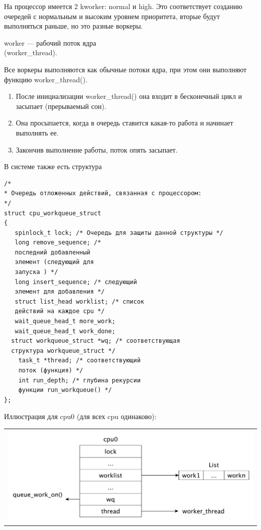 На процессор имеется 2 kworker: normal и high. Это соответствует созданию очередей с нормальным и высоким уровнем приоритета, вторые будут выполняться раньше, но это разные воркеры.

worker --- рабочий поток ядра \\ (worker\_thread).

Все воркеры выполняются как обычные потоки ядра, при этом они выполняют функцию worker\_thread().
\begin{enumerate}
  \item После инициализации worker\_thread() она входит в бесконечный цикл и засыпает (прерываемый сон).
  \item Она просыпается, когда в очередь ставится какая-то работа и начинает выполнять ее.
  \item Закончив выполнение работы, поток опять засыпает.
\end{enumerate}

В системе также есть структура

\begin{lstlisting}
/*
* Очередь отложенных действий, связанная с процессором:
*/
struct cpu_workqueue_struct 
{
   spinlock_t lock; /* Очередь для защиты данной структуры */
   long remove_sequence; /* 
   последний добавленный 
   элемент (следующий для 
   запуска ) */
   long insert_sequence; /* следующий 
   элемент для добавления */
   struct list_head worklist; /* список 
   действий на каждое cpu */
   wait_queue_head_t more_work;
   wait_queue_head_t work_done;
  struct workqueue_struct *wq; /* соответствующая 
  структура workqueue_struct */
    task_t *thread; /* соответствующий 
    поток (функция) */
    int run_depth; /* глубина рекурсии 
    функции run_workqueue() */
};
\end{lstlisting}

Иллюстрация для cpu0 (для всех cpu одинаково):

\begin{table}[h!]
  \centering
  \begin{tabular}{p{1\linewidth}}
    \centering
    \includegraphics[width=0.8\linewidth]{./images/cpu0.pdf}
  \end{tabular}
\end{table}

